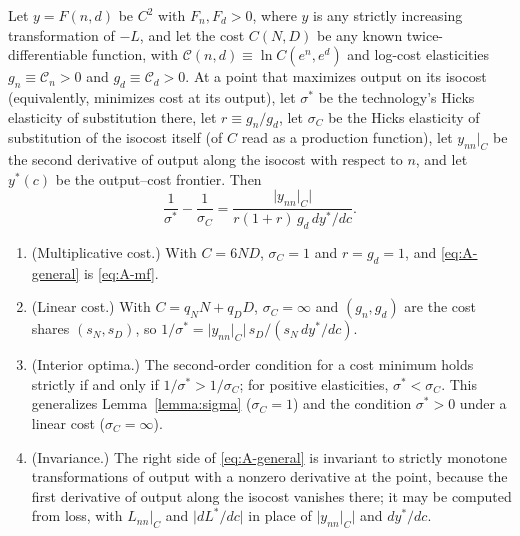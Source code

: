 \begin{corollary}\label{cor:A-general}
Let $y=F(n,d)$ be $C^2$ with $F_n,F_d>0$, where $y$ is any strictly increasing transformation of $-L$, and let the cost
$C(N,D)$ be any known twice-differentiable function, with $\mathcal C(n,d)\equiv\ln C(e^n,e^d)$ and log-cost elasticities
$g_n\equiv\mathcal C_n>0$ and $g_d\equiv\mathcal C_d>0$. At a point that maximizes output on its isocost (equivalently,
minimizes cost at its output), let $\sigma^*$ be the technology's Hicks elasticity of substitution there, let
$r\equiv g_n/g_d$, let $\sigma_C$ be the Hicks elasticity of substitution of the
isocost itself (of $C$ read as a production function), let $y_{nn}|_C$ be the second derivative of output along the
isocost with respect to $n$, and let $y^*(c)$ be the output--cost frontier. Then
\begin{equation}\label{eq:A-general}
\frac1{\sigma^*}-\frac1{\sigma_C}=\frac{\lvert y_{nn}|_C\rvert}{r(1+r)\,g_d\,dy^*/dc}.
\end{equation}
\begin{enumerate}
\item[(i)] (Multiplicative cost.) With $C=6ND$, $\sigma_C=1$ and $r=g_d=1$, and \eqref{eq:A-general} is \eqref{eq:A-mf}.
\item[(ii)] (Linear cost.) With $C=q_NN+q_DD$, $\sigma_C=\infty$ and $(g_n,g_d)$ are the cost shares $(s_N,s_D)$, so
$1/\sigma^*=\lvert y_{nn}|_C\rvert\,s_D/(s_N\,dy^*/dc)$.
\item[(iii)] (Interior optima.) The second-order condition for a cost minimum holds strictly if and only if
$1/\sigma^*>1/\sigma_C$; for positive elasticities, $\sigma^*<\sigma_C$. This generalizes Lemma~\ref{lemma:sigma}
($\sigma_C=1$) and the condition $\sigma^*>0$ under a linear cost ($\sigma_C=\infty$).
\item[(iv)] (Invariance.) The right side of \eqref{eq:A-general} is invariant to strictly monotone transformations of
output with a nonzero derivative at the point, because the first derivative of output along the isocost vanishes there;
it may be computed from loss, with $L_{nn}|_C$ and $\lvert dL^*/dc\rvert$ in place of $\lvert y_{nn}|_C\rvert$ and
$dy^*/dc$.
\end{enumerate}
\end{corollary}

